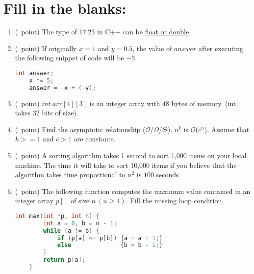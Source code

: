 \documentclass[14pt]{article}
\begin{document}
\section{Fill in the blanks:}
\begin{enumerate}[label=\alph*)]
    \item (\textonequarter\ point) The type of 17.23 in C++ can be \underline{\hspace{2cm}float or double\hspace{2cm}}.
    
    \item (\textonequarter\ point) If originally $x = 1$ and $y = 0.5$, the value of $answer$ after executing the following snippet of code will be \underline{\hspace{2cm}$-5$\hspace{2cm}}.
    \begin{lstlisting}[language=C++, title={Part (b)}]
    int answer;
    x *= 5;
    answer = -x + (-y);
    \end{lstlisting}
    
    \item (\textonequarter\ point) $int\ arr[4][3]$ is an integer array with \underline{\hspace{2cm}$48$\hspace{2cm}} bytes of memory. (int takes 32 bits of size).
    
    \item (\textonequarter\ point) Find the asymptotic relationship ($\mathcal{O}$/$\Omega$/$\Theta$). $n^k$ is \underline{\hspace{0.25cm}$\mathcal{O}$\hspace{0.25cm}}($c^n$). Assume that $k >= 1$ and $c > 1$ are constants.
    
    \item (\textonequarter\ point) A sorting algorithm takes 1 second to sort 1,000 items on your local machine. The time it will take to sort 10,000 items if you believe that the algorithm takes time proportional to $n^2$ is \underline{\hspace{1cm}$100$ seconds\hspace{1cm}}
    
    \item (\textonequarter\ point)
    The following function computes the maximum value contained in an integer array $p[]$ of size $n\ (n \geq 1)$. Fill the missing loop condition.
    \begin{lstlisting}[language=C++, title={Part (f)}]
    int max(int *p, int n) {
        int a = 0, b = n - 1;
        while (a != b) {
            if (p[a] <= p[b]) {a = a + 1;}
            else              {b = b - 1;}
        }
        return p[a];
    }
    \end{lstlisting}
    
\end{enumerate}
\end{document}
